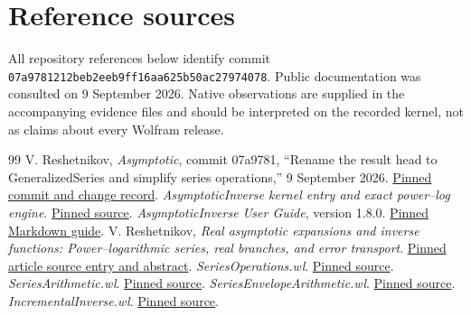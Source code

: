 \documentclass[11pt,a4paper]{article}
\newcommand{\commit}{\texttt{07a9781212beb2eeb9ff16aa625b50ac27974078}}
\begin{document}
\section{Reference sources}
All repository references below identify commit \commit. Public documentation was consulted on 9 September 2026. Native observations are supplied in the accompanying evidence files and should be interpreted on the recorded kernel, not as claims about every Wolfram release.

\begin{thebibliography}{99}
 V. Reshetnikov, \emph{Asymptotic}, commit 07a9781, ``Rename the result head to GeneralizedSeries and simplify series operations,'' 9 September 2026. \href{https://github.com/VladimirReshetnikov/Asymptotic/commit/07a9781212beb2eeb9ff16aa625b50ac27974078}{Pinned commit and change record}.
 \emph{AsymptoticInverse kernel entry and exact power--log engine}. \href{https://github.com/VladimirReshetnikov/Asymptotic/blob/07a9781212beb2eeb9ff16aa625b50ac27974078/AsymptoticInverse/Kernel/AsymptoticInverse.wl}{Pinned source}.
 \emph{AsymptoticInverse User Guide}, version 1.8.0. \href{https://github.com/VladimirReshetnikov/Asymptotic/blob/07a9781212beb2eeb9ff16aa625b50ac27974078/AsymptoticInverse/Documentation/UserGuide.md}{Pinned Markdown guide}.
 V. Reshetnikov, \emph{Real asymptotic expansions and inverse functions: Power--logarithmic series, real branches, and error transport}. \href{https://github.com/VladimirReshetnikov/Asymptotic/blob/07a9781212beb2eeb9ff16aa625b50ac27974078/article/asymptotic-inverse.tex}{Pinned article source entry and abstract}.
 \emph{SeriesOperations.wl}. \href{https://github.com/VladimirReshetnikov/Asymptotic/blob/07a9781212beb2eeb9ff16aa625b50ac27974078/AsymptoticInverse/Kernel/SeriesOperations.wl}{Pinned source}.
 \emph{SeriesArithmetic.wl}. \href{https://github.com/VladimirReshetnikov/Asymptotic/blob/07a9781212beb2eeb9ff16aa625b50ac27974078/AsymptoticInverse/Kernel/SeriesArithmetic.wl}{Pinned source}.
 \emph{SeriesEnvelopeArithmetic.wl}. \href{https://github.com/VladimirReshetnikov/Asymptotic/blob/07a9781212beb2eeb9ff16aa625b50ac27974078/AsymptoticInverse/Kernel/SeriesEnvelopeArithmetic.wl}{Pinned source}.
 \emph{IncrementalInverse.wl}. \href{https://github.com/VladimirReshetnikov/Asymptotic/blob/07a9781212beb2eeb9ff16aa625b50ac27974078/AsymptoticInverse/Kernel/IncrementalInverse.wl}{Pinned source}.

\end{thebibliography}
\end{document}
